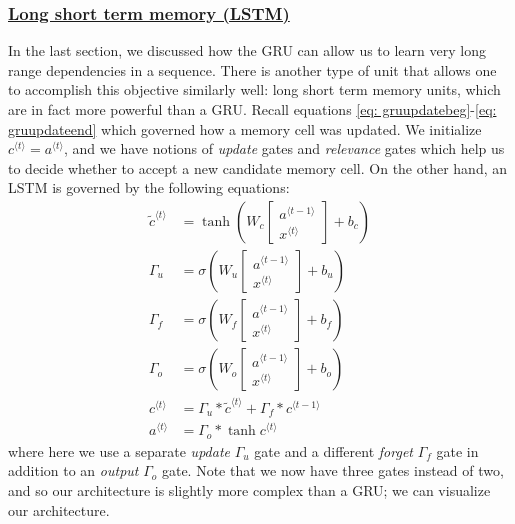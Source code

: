 \documentclass[12pt]{article}
\begin{document}
\subsubsection{\href{http://citeseerx.ist.psu.edu/viewdoc/download?doi=10.1.1.676.4320&rep=rep1&type=pdf}{Long short term memory (LSTM)}} In the last section, we discussed how the GRU can allow us to learn very long range dependencies in a sequence. There is another type of unit that allows one to accomplish this objective similarly well: long short term memory units, which are in fact more powerful than a GRU. Recall equations \ref{eq: gruupdatebeg}-\ref{eq: gruupdateend} which governed how a memory cell was updated. We initialize
$c^{\langle t \rangle} = a^{\langle t \rangle}$, and we have notions of \emph{update} gates and \emph{relevance} gates which help us to decide whether to accept a new candidate memory cell. On the other hand, an LSTM is governed by the following equations:
\begin{align*}
  \tilde c^{\langle t \rangle} &= \tanh \left( W_c \begin{bmatrix} a^{\langle t -       1 \rangle} \\ x^{\langle t \rangle} \end{bmatrix} + b_c \right) \\
  \Gamma_u &= \sigma \left(W_u \begin{bmatrix} a^{\langle t -       1 \rangle}     \\ x^{\langle t \rangle} \end{bmatrix} + b_u\right) \\
  \Gamma_f &= \sigma \left(W_f \begin{bmatrix} a^{\langle t -       1 \rangle}     \\ x^{\langle t \rangle} \end{bmatrix} + b_f \right) \\
  \Gamma_o &= \sigma \left(W_o \begin{bmatrix} a^{\langle t -       1 \rangle}     \\ x^{\langle t \rangle} \end{bmatrix} + b_o \right) \\
  c^{\langle t \rangle} &= \Gamma_u * \tilde c^{\langle t \rangle} + \Gamma_f *   c^{\langle t - 1 \rangle} \\
  a^{\langle t \rangle} &= \Gamma_o * \tanh c^{\langle t \rangle}
\end{align*}
where here we use a separate \emph{update} $\Gamma_u$ gate and a different \emph{forget} $\Gamma_f$ gate in addition to an \emph{output} $\Gamma_o$ gate. Note that we now have three gates instead of two, and so our architecture is slightly more complex than a GRU; we can visualize our architecture.
\end{document}
